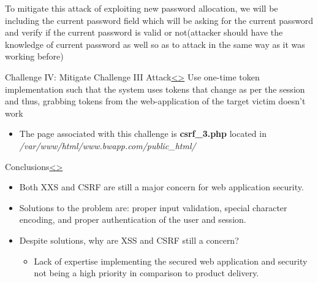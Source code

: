 \documentclass[12pt]{extarticle}
\newenvironment{instructionblock}{\Large\bgroup}{\egroup}
\begin{document}
\vspace{4mm}
\noindent
To mitigate this attack of exploiting new password allocation, we will be including the current password field which will be asking for the current password and verify if the current password is valid or not(attacker should have the knowledge of current password as well so as to attack in the same way as it was working before)




\pagebreak
\begin{slide}{Challenge IV: Mitigate Challenge III Attack}{\hyperref[slide 19]{\textless}\hyperref[slide 21]{\textgreater}}
	\begin{instructionblock}
		Use one-time token implementation such that the system uses tokens that change as per the session and thus, grabbing tokens from the web-application of the target victim doesn't work
		\begin{itemize}
			\item The page associated with this challenge is \textbf{csrf\_3.php} located in \textit{/var/www/html/www.bwapp.com/public\_html/} 
		\end{itemize}
	\end{instructionblock}	
\end{slide}




\pagebreak
\begin{slide}{Conclusions}{\hyperref[slide 20]{\textless}\hyperref[slide 22]{\textgreater}}
	\begin{instructionblock}
		\begin{itemize}
			\item Both XXS and CSRF are still a major concern for web application security.
			\item Solutions to the problem are: proper input validation, special character encoding, and proper authentication of the user and session. 
			\item Despite solutions, why are XSS and CSRF still a concern?
			\begin{itemize}
				\item Lack of expertise implementing the secured web application and security not being a high priority in comparison to product delivery.
			\end{itemize}
		\end{itemize}
	\end{instructionblock}	
\end{slide}
\end{document}
